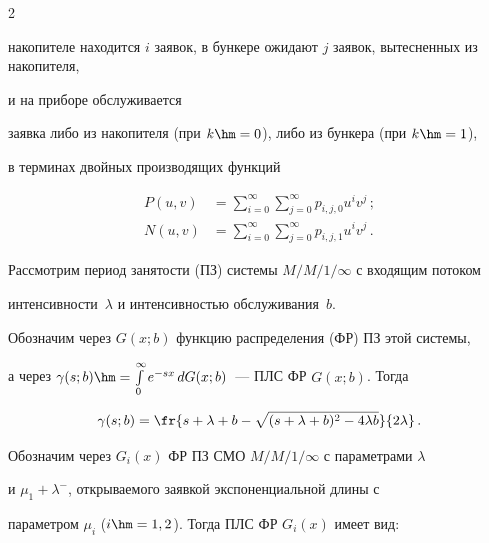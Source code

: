 \begin{multicols}{2}
\begin{itemize}
накопителе находится $i$ заявок, в бункере ожидают $j$ заявок, вытесненных из накопителя,


и на приборе обслуживается


заявка либо из накопителя (при $k\hm=0$), либо из бункера (при $k\hm=1$),


в терминах двойных производящих функций


\begin{align*}


\label{(11)}


P(u,v) &= \sum\limits_{i=0}^{\infty}


\sum\limits_{j=0}^{\infty}


p_{i,j,0} u^i v^j\,;


\\


N(u,v)&= \sum\limits_{i=0}^{\infty}


\sum\limits_{j=0}^{\infty} p_{i,j,1} u^i v^j\,.


\end{align*}


\end{itemize}





Рассмотрим период занятости (ПЗ) системы $M/M/1/\infty$ с входящим потоком


интенсивности~$\lambda$ и интенсивностью обслуживания~$b$.


Обозначим через $G(x;b)$ функцию распределения (ФР) ПЗ этой системы,


а через $\gamma(s;b)\hm=\int\limits_0^{\infty} e^{-sx}\,dG(x;b)$~--- ПЛС ФР $G(x;b)$. Тогда




\begin{equation*}


\gamma(s;b)= \fr{s+\lambda+b - \sqrt{(s+\lambda+b)^2 - 4 \lambda b}


}{2 \lambda}\,.


\end{equation*}







Обозначим через $G_i(x)$ ФР ПЗ СМО $M/M/1/\infty$ с параметрами $\lambda$


и $\mu_1 + \lambda^-$, открываемого заявкой экспоненциальной длины с


параметром $\mu_i$ ($i \hm=1,2$). Тогда ПЛС ФР $G_i(x)$ имеет вид:



\end{multicols}

